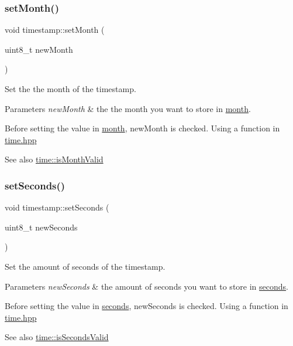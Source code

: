 \subsubsection{\texorpdfstring{set\+Month()}{setMonth()}}
{\footnotesize\ttfamily void timestamp\+::set\+Month (\begin{DoxyParamCaption}\item[{uint8\+\_\+t}]{new\+Month }\end{DoxyParamCaption})}



Set the the month of the timestamp. 


\begin{DoxyParams}{Parameters}
{\em new\+Month} & the the month you want to store in \mbox{\hyperlink{classtimestamp_a71df69b7ebb5a6dd228f4ae70b954505}{month}}.\\
\hline
\end{DoxyParams}
Before setting the value in \mbox{\hyperlink{classtimestamp_a71df69b7ebb5a6dd228f4ae70b954505}{month}}, new\+Month is checked. Using a function in \mbox{\hyperlink{time_8hpp_source}{time.\+hpp}} \begin{DoxySeeAlso}{See also}
\mbox{\hyperlink{classtime_a92c265ce96b24f9bdfa960144a0bce11}{time\+::is\+Month\+Valid}} 
\end{DoxySeeAlso}
\mbox{\label{classtimestamp_a7d2a5311e064fb9fe0ebbb74e603091c}} 
\subsubsection{\texorpdfstring{set\+Seconds()}{setSeconds()}}
{\footnotesize\ttfamily void timestamp\+::set\+Seconds (\begin{DoxyParamCaption}\item[{uint8\+\_\+t}]{new\+Seconds }\end{DoxyParamCaption})}



Set the amount of seconds of the timestamp. 


\begin{DoxyParams}{Parameters}
{\em new\+Seconds} & the amount of seconds you want to store in \mbox{\hyperlink{classtimestamp_a15ad236c6963bfbd6ae18416697c91c2}{seconds}}.\\
\hline
\end{DoxyParams}
Before setting the value in \mbox{\hyperlink{classtimestamp_a15ad236c6963bfbd6ae18416697c91c2}{seconds}}, new\+Seconds is checked. Using a function in \mbox{\hyperlink{time_8hpp_source}{time.\+hpp}} \begin{DoxySeeAlso}{See also}
\mbox{\hyperlink{classtime_aeba296b9c9c6ec09250f98a20062a500}{time\+::is\+Seconds\+Valid}} 
\end{DoxySeeAlso}
\mbox{\label{classtimestamp_a2ad3d28f226c8f2ed74c06c609e29aff}} 
